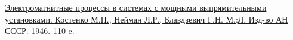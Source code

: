 \documentclass{article}
\begin{document}
\renewcommand{\bibname}{}
\begin{thebibliography}{3} 
	 \href{http://books.e-heritage.ru/book/10078915}{Электромагнитные процессы в системах с мощными выпрямительными установками.
Костенко М.П., Нейман Л.Р., Блавдзевич Г.Н. М.;Л. Изд-во АН СССР. 1946. 110 c.}
\end{thebibliography}
\end{document}

